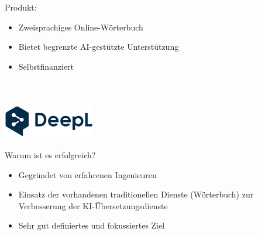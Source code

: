 \documentclass[handout]{beamer}
\begin{document}
\begin{frame}
    Produkt: \\
    \begin{itemize}
        \item<1-> Zweisprachiges Online-Wörterbuch
        \item<2-> Bietet begrenzte AI-gestützte Unterstützung
        \item<3-> Selbstfinanziert
    \end{itemize} ~\\
\end{frame}

\begin{frame}
    \frametitle{\includegraphics[width=0.3\textwidth]{deepl.png}}
    Warum ist es erfolgreich? \\
    \begin{itemize}
        \item<1-> Gegründet von erfahrenen Ingenieuren
        \item<2-> Einsatz der vorhandenen traditionellen Dienste (Wörterbuch) zur Verbesserung der KI-Übersetzungsdienste
        \item<3-> Sehr gut definiertes und fokussiertes Ziel
    \end{itemize} ~\\
\end{frame}
\end{document}
